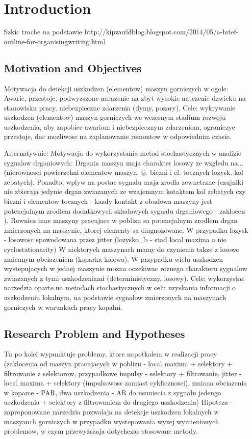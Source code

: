 \chapter{Introduction}
Szkic troche na podstawie http://kipworldblog.blogspot.com/2014/05/a-brief-outline-for-organisingwriting.html
\section{Motivation and Objectives}

Motywacja do detekcji uszkodzen (elementow) maszyn gorniczych w ogole: Awarie, przestoje, podwyzszone narazenie na zbyt wysokie natezenie dzwieku na stanowisku pracy, niebezpieczne zdarzenia (dymy, pozary).
Cele: wykrywanie uszkodzen (elementow) maszyn gorniczych we wczesnym stadium rozwoju uszkodzenia, aby zapobiec awariom i niebezpiecznym zdarzeniom, ograniczyc przestoje, dac mozliwosc na zaplanowanie remontow w odpowiednim czasie.

Alternatywnie:
Motywacja do wykorzystania metod stochastycznych w analizie sygnalow drganiowych:
Drgania maszyn maja charakter losowy ze wzgledu na...(nierownosci powierzchni elementow maszyn, tj. biezni i el. tocznych lozysk, kol zebatych).
Ponadto, wplyw na postac sygnalu maja zrodla zewnetrzne (czujniki nie zbieraja jedynie drgan zwiazanych ze wzajemnym kotaktem kol zebatych czy biezni i elementow tocznych - kazdy kontakt z obudowa maszyny jest potencjalnym zrodlem dodatkowych skladowych sygnalu drganiowego - zaklocen ).
Rowniez inne maszyny pracujace w poblizu sa potencjalnym zrodlem drgan zmierzonych na maszynie, ktorej elementy sa diagnozowane.
W przypadku lozysk - losowosc spowodowana przez jitter (lozysko\_b - stad local maxima a nie cyclostationarity)
W niektorych maszynach mamy do czynienia takze z losowo zmiennym obciazeniem (koparka kolowa).
W przypadku wielu uszkodzen wystepujacych w jednej maszynie mozna oczekiwac roznego charakteru sygnalow zwiazanych z tymi uszkodzeniami (deterministyczny, losowy).
Cele: wykorzystac narzedzia oparte na metodach stochastycznych w celu uzyskania informacji o uszkodzeniu lokalnym, na podstawie sygnalow zmierzonych na maszynach gorniczych w warunkach pracy kopalni.

\section{Research Problem and Hypotheses}

Tu po kolei wypunktuje problemy, ktore napotkalem w realizacji pracy (zaklocenia od maszyn pracujacych w poblizu - local maxima + selektory + filtrowanie z selektorow, przypadkowe impulsy - selektory + filtrowanie, jitter - local maxima + selektory (impulsowosc zamiast cyklicznosci), zmiana obciazenia w koparce - PAR, dwa uszkodzenia - AR do usuniecia z sygnalu jedengo uszkodzenia + selektory z filtrowaniem do drugiego uszkodzenia)
Hipoteza - zaproponowane narzedzia pozwalaja na detekcje uszkodzen lokalnych w maszyanch gorniczych w przypadku wystepowania wyzej wymienionych problemow, w czym przewyzszaja dotychczas stosowane metody.


